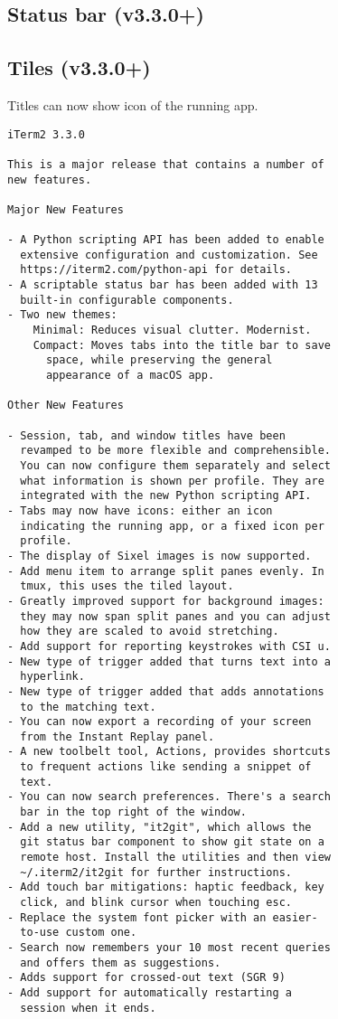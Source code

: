\subsection{Status bar (v3.3.0+)}


\subsection{Tiles (v3.3.0+)}

Titles can now show icon of the running app.

\begin{verbatim}
iTerm2 3.3.0

This is a major release that contains a number of
new features.

Major New Features

- A Python scripting API has been added to enable
  extensive configuration and customization. See
  https://iterm2.com/python-api for details.
- A scriptable status bar has been added with 13
  built-in configurable components.
- Two new themes:
    Minimal: Reduces visual clutter. Modernist.
    Compact: Moves tabs into the title bar to save
      space, while preserving the general
      appearance of a macOS app.

Other New Features

- Session, tab, and window titles have been
  revamped to be more flexible and comprehensible.
  You can now configure them separately and select
  what information is shown per profile. They are
  integrated with the new Python scripting API.
- Tabs may now have icons: either an icon
  indicating the running app, or a fixed icon per
  profile.
- The display of Sixel images is now supported.
- Add menu item to arrange split panes evenly. In
  tmux, this uses the tiled layout.
- Greatly improved support for background images:
  they may now span split panes and you can adjust
  how they are scaled to avoid stretching.
- Add support for reporting keystrokes with CSI u.
- New type of trigger added that turns text into a
  hyperlink.
- New type of trigger added that adds annotations
  to the matching text.
- You can now export a recording of your screen
  from the Instant Replay panel.
- A new toolbelt tool, Actions, provides shortcuts
  to frequent actions like sending a snippet of
  text.
- You can now search preferences. There's a search
  bar in the top right of the window.
- Add a new utility, "it2git", which allows the
  git status bar component to show git state on a
  remote host. Install the utilities and then view
  ~/.iterm2/it2git for further instructions.
- Add touch bar mitigations: haptic feedback, key
  click, and blink cursor when touching esc.
- Replace the system font picker with an easier-
  to-use custom one.
- Search now remembers your 10 most recent queries
  and offers them as suggestions.
- Adds support for crossed-out text (SGR 9)
- Add support for automatically restarting a
  session when it ends.



\end{verbatim}
